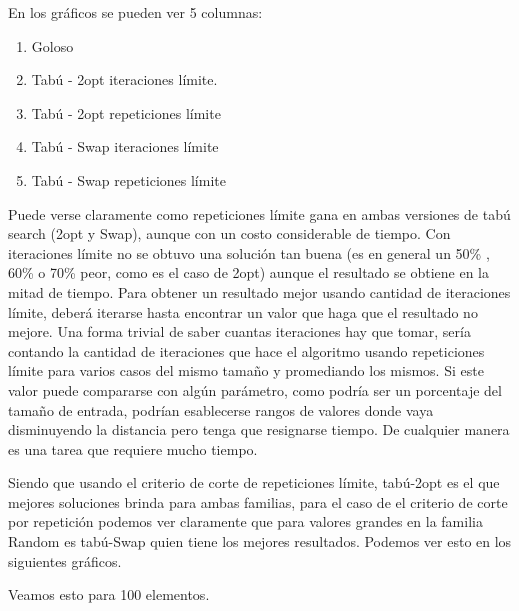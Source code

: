 En los gráficos se pueden ver 5 columnas:

\begin{enumerate}
\item Goloso
\item Tabú - 2opt iteraciones límite.
\item Tabú - 2opt repeticiones límite
\item Tabú - Swap iteraciones límite
\item Tabú - Swap repeticiones límite
\end{enumerate}

Puede verse claramente como repeticiones límite gana en ambas versiones de tabú search (2opt y Swap), aunque con un costo considerable de tiempo. Con iteraciones límite no se obtuvo una solución tan buena (es en general un 50\% , 60\% o 70\% peor, como es el caso de 2opt) aunque el resultado se obtiene en la mitad de tiempo. Para obtener un resultado mejor usando cantidad de iteraciones límite, deberá iterarse hasta encontrar un valor que haga que el resultado no mejore. Una forma trivial de saber cuantas iteraciones hay que tomar, sería contando la cantidad de iteraciones que hace el algoritmo usando repeticiones límite para varios casos del mismo tamaño y promediando los mismos. Si este valor puede compararse con algún parámetro, como podría ser un porcentaje del tamaño de entrada, podrían esablecerse rangos de valores donde vaya disminuyendo la distancia pero tenga que resignarse tiempo. De cualquier manera es una tarea que requiere mucho tiempo.

Siendo que usando el criterio de corte de repeticiones límite, tabú-2opt es el que mejores soluciones brinda para ambas familias, para el caso de el criterio de corte por repetición podemos ver claramente que para valores grandes en la familia Random es tabú-Swap quien tiene los mejores resultados. Podemos ver esto en los siguientes gráficos.

Veamos esto para 100 elementos.

